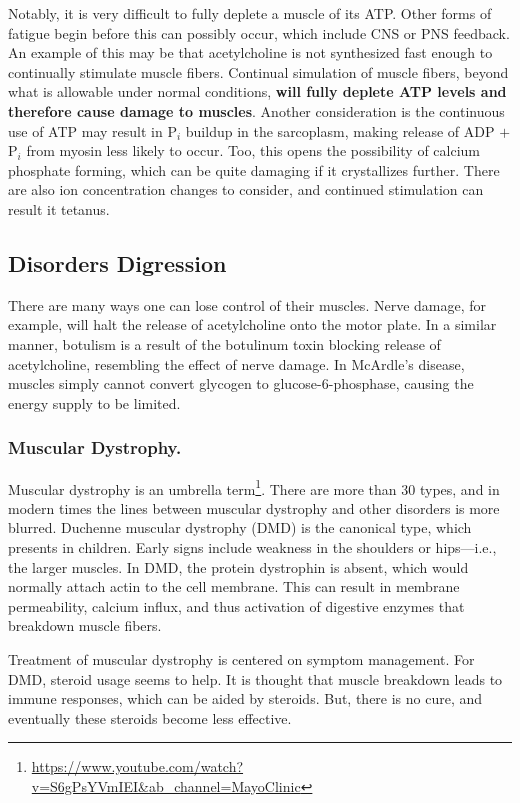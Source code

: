 Notably, it is very difficult to fully deplete a muscle of its ATP. Other forms of fatigue begin before this can possibly occur, which include CNS or PNS feedback. An example of this may be that acetylcholine is not synthesized fast enough to continually stimulate muscle fibers. Continual simulation of muscle fibers, beyond what is allowable under normal conditions, \textbf{will fully deplete ATP levels and therefore cause damage to muscles}. Another consideration is the continuous use of ATP may result in P$_i$ buildup in the sarcoplasm, making release of ADP $+$ P$_i$ from myosin less likely to occur. Too, this opens the possibility of calcium phosphate forming, which can be quite damaging if it crystallizes further. There are also ion concentration changes to consider, and continued stimulation can result it tetanus.

\subsection{Disorders Digression}
There are many ways one can lose control of their muscles. Nerve damage, for example, will halt the release of acetylcholine onto the motor plate. In a similar manner, botulism is a result of the botulinum toxin blocking release of acetylcholine, resembling the effect of nerve damage. In McArdle's disease, muscles simply cannot convert glycogen to glucose-6-phosphase, causing the energy supply to be limited. 

\subsubsection{Muscular Dystrophy.}

Muscular dystrophy is an umbrella term\footnote{\url{https://www.youtube.com/watch?v=S6gPsYVmIEI\&ab_channel=MayoClinic}}. There are more than 30 types, and in modern times the lines between muscular dystrophy and other disorders is more blurred. Duchenne muscular dystrophy (DMD) is the canonical type, which presents in children. Early signs include weakness in the shoulders or hips---i.e., the larger muscles. In DMD, the protein dystrophin is absent, which would normally attach actin to the cell membrane. This can result in membrane permeability, calcium influx, and thus activation of digestive enzymes that breakdown muscle fibers.\newline

Treatment of muscular dystrophy is centered on symptom management. For DMD, steroid usage seems to help. It is thought that muscle breakdown leads to immune responses, which can be aided by steroids. But, there is no cure, and eventually these steroids become less effective. 

